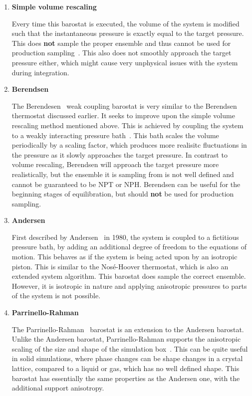 \documentclass[9pt,bestpractices]{livecoms}
\begin{document}
\begin{enumerate}[listparindent=\parindent]

    \item \textbf{Simple volume rescaling}

        Every time this barostat is executed, the volume of the system is modified such that the instantaneous pressure is exactly equal to the target pressure.
        This does \textbf{not} sample the proper ensemble and thus cannot be used for production sampling~\cite{ShellNotes}.
        This also does not smoothly approach the target pressure either, which might cause very unphysical issues with the system during integration.

    \item \textbf{Berendsen}

        The Berendesen~\cite{berendsen1984molecular} weak coupling barostat is very similar to the Berendsen thermostat discussed earlier.
        It seeks to improve upon the simple volume rescaling method mentioned above.
        This is achieved by coupling the system to a weakly interacting pressure bath~\cite{berendsen1984molecular}.
        This bath scales the volume periodically by a scaling factor, which produces more realisitc fluctuations in the pressure as it slowly approaches the target pressure.
        In contrast to volume rescaling, Berendsen will approach the target pressure more realistically, but the ensemble it is sampling from is not well defined and cannot be guaranteed to be NPT or NPH\@.
        Berendsen can be useful for the beginning stages of equilibration, but should \textbf{not} be used for production sampling.

    \item \textbf{Andersen}

        First described by Andersen~\cite{andersen1980molecular} in 1980, the system is coupled to a fictitious pressure bath, by adding an additional degree of freedom to the equations of motion.
        This behaves as if the system is being acted upon by an isotropic piston.
        This is similar to the Nos\'{e}-Hoover thermostat, which is also an extended system algorithm.
        This barostat does sample the correct ensemble. However, it is isotropic in nature and applying anisotropic pressures to parts of the system is not possible.

    \item \textbf{Parrinello-Rahman}

        The Parrinello-Rahman~\cite{Parrinello1981} barostat is an extension to the Andersen barostat.
        Unlike the Andersen barostat, Parrinello-Rahman supports the anisotropic scaling of the size and shape of the simulation box~\cite{Parrinello1981}.
        This can be quite useful in solid simulations, where phase changes can be shape changes in a crystal lattice, compared to a liquid or gas, which has no well defined shape.
        This barostat has essentially the same properties as the Andersen one, with the additional support anisotropy.


\end{enumerate}
\end{document}
